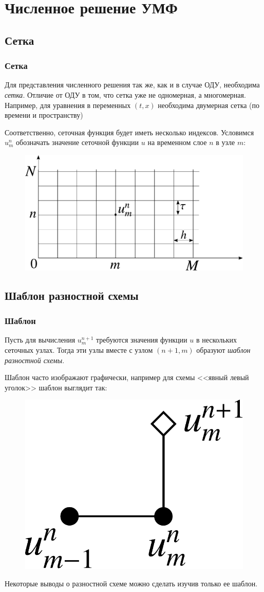 \documentclass[professionalfonts,compress,unicode,aspectratio=169]{beamer}
\begin{document}
\section{Численное решение УМФ}
\subsection{Сетка}
\begin{frame}\frametitle{Сетка}
	Для представления численного решения так же, как и в случае ОДУ, необходима \emph{сетка}.
	Отличие от ОДУ в том, что сетка уже не одномерная, а многомерная. Например, для уравнения в переменных $(t,x)$
	необходима двумерная сетка (по времени и пространству)

	Соответственно, сеточная функция будет иметь несколько индексов. Условимся $u^n_m$ обозначать
	значение сеточной функции $u$ на временном слое $n$ в узле $m$:
	\begin{figure}%
	\includegraphics[height=0.5\textheight]{grid.pdf}%
	\end{figure}
\end{frame}

\subsection{Шаблон разностной схемы}
\begin{frame}\frametitle{Шаблон}
	Пусть для вычисления $u^{n+1}_m$ требуются значения функции $u$ в нескольких сеточных узлах.
	Тогда эти узлы вместе с узлом $(n+1,m)$ образуют \emph{шаблон разностной схемы}.
	
	Шаблон часто изображают графически, например для схемы <<явный левый уголок>> шаблон выглядит так:
	\begin{figure}%
	\includegraphics[width=0.3\columnwidth]{stencil.pdf}%
	\end{figure}

	Некоторые выводы о разностной схеме можно сделать изучив только ее шаблон.
\end{frame}
\end{document}
